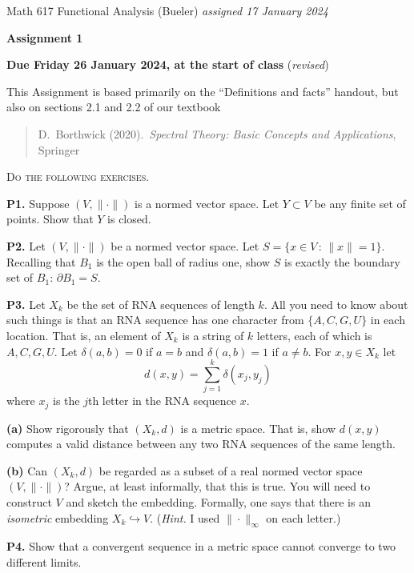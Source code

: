 \documentclass[12pt]{amsart}
\newcommand{\prob}[1]{\bigskip\noindent\textbf{#1.}\quad }
\newcommand{\epart}[1]{\medskip\noindent\textbf{(#1)}\quad }
\begin{document}
\scriptsize \noindent Math 617 Functional Analysis (Bueler) \hfill \emph{assigned 17 January 2024}
\normalsize\medskip

\Large\centerline{\textbf{Assignment 1}}
\large
\medskip

\centerline{\textbf{Due Friday 26 January 2024, at the start of class} (\emph{revised})}
\medskip
\normalsize

\thispagestyle{empty}

\bigskip
\noindent This Assignment is based primarily on the ``Definitions and facts'' handout, but also on sections 2.1 and 2.2 of our textbook

\begin{quote}
D.~Borthwick (2020).~\emph{Spectral Theory: Basic Concepts and Applications}, Springer
\end{quote}

\medskip
\noindent \textsc{Do the following exercises.}
\smallskip


\prob{P1}  Suppose $(V,\|\cdot\|)$ is a normed vector space.  Let $Y \subset V$ be any finite set of points.  Show that $Y$ is closed.

\prob{P2}  Let $(V,\|\cdot\|)$ be a normed vector space.  Let $S=\{x\in V\,:\,\|x\|=1\}$.  Recalling that $B_1$ is the open ball of radius one, show $S$ is exactly the boundary set of $B_1$: $\partial B_1=S$.

\prob{P3}  Let $X_k$ be the set of RNA sequences of length $k$.  All you need to know about such things is that an RNA sequence has one character from $\{A,C,G,U\}$ in each location.  That is, an element of $X_k$ is a string of $k$ letters, each of which is $A,C,G,U$.  Let $\delta(a,b)=0$ if $a=b$ and $\delta(a,b)=1$ if $a\ne b$.  For $x,y \in X_k$ let
	$$d(x,y) = \sum_{j=1}^k \delta(x_j,y_j)$$
where $x_j$ is the $j$th letter in the RNA sequence $x$.

\epart{a}  Show rigorously that $(X_k,d)$ is a metric space.  That is, show $d(x,y)$ computes a valid distance between any two RNA sequences of the same length.

\epart{b}  Can $(X_k,d)$ be regarded as a subset of a real normed vector space $(V,\|\cdot\|)$?  Argue, at least informally, that this is true.  You will need to construct $V$ and sketch the embedding.  Formally, one says that there is an \emph{isometric} embedding $X_k \hookrightarrow V$.  (\emph{Hint.}  I used $\|\cdot\|_\infty$ on each letter.)

\prob{P4}  Show that a convergent sequence in a metric space cannot converge to two different limits.
\end{document}
